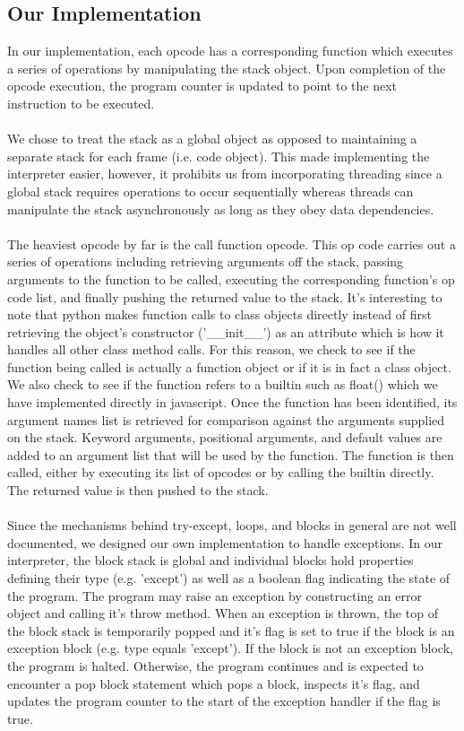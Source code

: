\documentclass{article}
\begin{document}
\subsection{Our Implementation}
In our implementation, each opcode has a corresponding function which executes a series of operations by manipulating the stack object.  Upon completion of the opcode execution, the program counter is updated to point to the next instruction to be executed.\\
\\
We chose to treat the stack as a global object as opposed to maintaining a separate stack for each frame (i.e. code object).  This made implementing the interpreter easier, however, it prohibits us from incorporating threading since a global stack requires operations to occur sequentially whereas threads can manipulate the stack asynchronously as long as they obey data dependencies.\\
\\
The heaviest opcode by far is the call function opcode.  This op code carries out a series of operations including retrieving arguments off the stack, passing arguments to the function to be called, executing the corresponding function's op code list, and finally pushing the returned value to the stack.  It's interesting to note that python makes function calls to class objects directly instead of first retrieving the object's constructor ('\_\_init\_\_') as an attribute which is how it handles all other class method calls.  For this reason, we check to see if the function being called is actually a function object or if it is in fact a class object.  We also check to see if the function refers to a builtin such as float() which we have implemented directly in javascript.  Once the function has been identified, its argument names list is retrieved for comparison against the arguments supplied on the stack.  Keyword arguments, positional arguments, and default values are added to an argument list that will be used by the function.  The function is then called, either by executing its list of opcodes or by calling the builtin directly.  The returned value is then pushed to the stack.\\
\\
Since the mechanisms behind try-except, loops, and blocks in general are not well documented, we designed our own implementation to handle exceptions.  In our interpreter, the block stack is global and individual blocks hold properties defining their type (e.g. 'except') as well as a boolean flag indicating the state of the program.  The program may raise an exception by constructing an error object and calling it's throw method.  When an exception is thrown, the top of the block stack is temporarily popped and it's flag is set to true if the block is an exception block (e.g. type equals 'except').  If the block is not an exception block, the program is halted.  Otherwise, the program continues and is expected to encounter a pop block statement which pops a block, inspects it's flag, and updates the program counter to the start of the exception handler if the flag is true.
\end{document}
